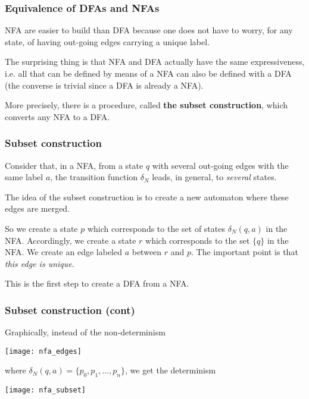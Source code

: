 
% 
\begin{frame}
\frametitle{Equivalence of DFAs and NFAs}

\bigskip

NFA are easier to build than DFA because one does not have to worry,
for any state, of having out-going edges carrying a unique label.

\bigskip

The surprising thing is that NFA and DFA actually have the same
expressiveness, i.e. all that can be defined by means of a NFA can
also be defined with a DFA (the converse is trivial since a DFA is
already a NFA).

\bigskip

More precisely, there is a procedure, called \textbf{the subset
construction}, which converts any NFA to a DFA.

\end{frame}

% 
\begin{frame}
\frametitle{Subset construction}

Consider that, in a NFA, from a state \(q\) with several out-going
edges with the same label \(a\), the transition function \(\delta_N\)
leads, in general, to \emph{several} states.

\bigskip

The idea of the subset construction is to create a new automaton where
these edges are merged. 

\bigskip

So we create a state \(p\) which corresponds to the set of states
\(\delta_N (q,a)\) in the NFA. Accordingly, we create a state \(r\)
which corresponds to the set \(\{q\}\) in the NFA. We create an edge
labeled \(a\) between \(r\) and \(p\). The important point is that
\emph{this edge is unique}.

\bigskip

This is the first step to create a DFA from a NFA.

\end{frame}

% 
\begin{frame}
\frametitle{Subset construction (cont)}

Graphically, instead of the non-determinism
\begin{center}
\texttt{[image: nfa\_edges]}
\end{center}
where \(\delta_N (q, a) = \{p_0, p_1, \dots, p_n\}\), we get the
determinism
\begin{center}
\texttt{[image: nfa\_subset]}
\end{center}

\end{frame}

